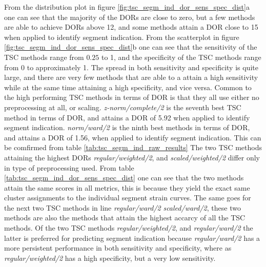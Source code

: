 From the distribution plot in figure \ref{fig:tsc_segm_ind_dor_sens_spec_dist}a one can see that the majority of the DORs are close to zero, 
but a few methods are able to achieve DORs above 12, and some methods attain a DOR close to 15 when applied to identify segment indication.
From the scatterplot in figure \ref{fig:tsc_segm_ind_dor_sens_spec_dist}b one can see that the sensitivity of the TSC methods range from $0.25$ to 1, 
and the specificity of the TSC methods range from 0 to approximately 1. 
The spread in both sensitivity and specificity is quite large, and there are very few methods that are 
able to a attain a high sensitivity while at the same time attaining a high specificity, and vice versa. 
Common to the high performing TSC methods in terms of DOR is that they all use either no preprocessing at all, or scaling.
\textit{z-norm/complete/2} is the seventh best TSC method in terms of DOR, and attains a DOR of 5.92 when applied to identify segment indication. 
\textit{norm/ward/2} is the ninth best methods in terms of DOR, and attains a DOR of 1.56, when applied to identify segment indication.
This can be comfirmed from table \ref{tab:tsc_segm_ind_raw_results}
The two TSC methods attaining the highest DORs \textit{regular/weighted/2}, and \textit{scaled/weighted/2} differ only in type of preprocessing used.
From table \ref{tab:tsc_segm_ind_dor_sens_spec_dist} one can see that the two methods attain the same scores in all metrics,
this is because they yield the exact same cluster assignments to the individual segment strain curves.
The same goes for the next two TSC methods in line \textit{regular/ward/2} \textit{scaled/ward/2}, these two methods are also the methods that attain the highest accarcy of all the TSC methods.
Of the two TSC methods \textit{regular/weighted/2}, and \textit{regular/ward/2} the latter is preferred for predicting segment indication because \textit{regular/ward/2} has a more persistent
performance in both sensitivity and specificity, where as \textit{regular/weighted/2} has a high specificity, but a very low sensitivity.

